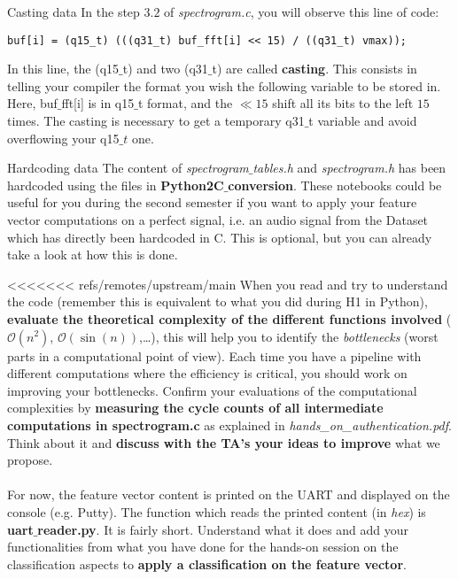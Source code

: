 \begin{bclogo}[couleur = gray!20, arrondi = 0.2, logo=\bcinfo]{Casting data}
%
In the step $3.2$ of \emph{spectrogram.c}, you will observe this line of code:
%
\begin{lstlisting}
buf[i] = (q15_t) (((q31_t) buf_fft[i] << 15) / ((q31_t) vmax));
\end{lstlisting}
%
In this line, the (q15$\_$t) and two (q31$\_$t) are called \textbf{casting}. This consists in telling your compiler the format you wish the following variable to be stored in. Here, buf$\_$fft[i] is in q15$\_$t format, and the $\ll 15$ shift all its bits to the left $15$ times. The casting is necessary to get a temporary q31$\_$t variable and avoid overflowing your q15$\_t$ one.
%
\end{bclogo}
%
\begin{bclogo}[couleur = gray!20, arrondi = 0.2, logo=\bcinfo]{Hardcoding data}
The content of \emph{spectrogram$\_$tables.h} and \emph{spectrogram.h} has been hardcoded using the files in \textbf{Python2C$\_$conversion}. These notebooks could be useful for you during the second semester if you want to apply your feature vector computations on a perfect signal, i.e. an audio signal from the Dataset which has directly been hardcoded in C. This is optional, but you can already take a look at how this is done.
\end{bclogo}
%
<<<<<<< refs/remotes/upstream/main
When you read and try to understand the code (remember this is equivalent to what you did during H1 in Python), \textbf{evaluate the theoretical complexity of the different functions involved} ($\mathcal O(n^2)$, $\mathcal O(\sin (n))$,\ldots), this will help you to identify the \emph{bottlenecks} (worst parts in a computational point of view). Each time you have a pipeline with different computations where the efficiency is critical, you should work on improving your bottlenecks. Confirm your evaluations of the computational complexities by \textbf{measuring the cycle counts of all intermediate computations in spectrogram.c} as explained in \emph{hands\_on\_authentication.pdf}.
Think about it and \textbf{discuss with the TA's your ideas to improve} what we propose. \\
\\
For now, the feature vector content is printed on the UART and displayed on the console (e.g. Putty). The function which reads the printed content (in \emph{hex}) is \textbf{uart$\_$reader.py}. It is fairly short. Understand what it does and add your functionalities from what you have done for the hands-on session on the classification aspects to \textbf{apply a classification on the feature vector}. \\
